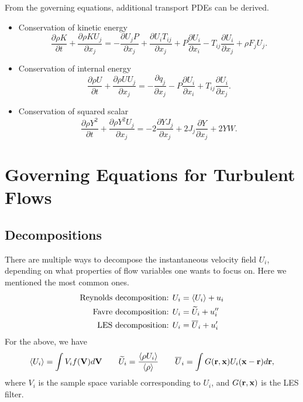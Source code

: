 \documentclass[oneside,a4paper,11pt]{report}
\begin{document}
From the governing equations, additional transport PDEs can be derived.
\begin{itemize}
\item Conservation of kinetic energy
\begin{equation}
\label{eq:cons_kinetic_energy}
\frac{\partial \rho K}{\partial t} + \frac{\partial \rho K U_j}{\partial x_j} = - \frac{\partial U_j P}{\partial x_j} + \frac{\partial U_i T_{ij}}{\partial x_j} + P \frac{\partial U_i}{\partial x_i} - T_{ij} \frac{\partial U_i}{\partial x_j} + \rho F_j U_j .
\end{equation}
\item Conservation of internal energy
\begin{equation}
\label{eq:cons_internal_energy}
\frac{ \partial \rho U}{\partial t} + \frac{\partial \rho U U_j}{\partial x_j} = -\frac{\partial q_j}{\partial x_j} - P \frac{\partial U_i}{\partial x_i} + T_{ij} \frac{\partial U_i}{\partial x_j}.
\end{equation}
\item Conservation of squared scalar
\begin{equation}
    \label{eq:cons_squared_scalar}
    \frac{\partial \rho Y^2}{\partial t} + \frac{\partial \rho Y^2 U_j}{\partial x_j} = -2\frac{\partial Y J_j}{\partial x_j} + 2J_j \frac{\partial Y}{\partial x_j} + 2 Y W.
\end{equation}
\end{itemize}

%
\chapter{Governing Equations for Turbulent Flows}
%

\section{Decompositions}

There are multiple ways to decompose the instantaneous velocity field $U_i$, depending on what properties of flow variables one wants to focus on. Here we mentioned the most common ones.
\begin{align}
\text{Reynolds decomposition: } & U_i = \langle U_i \rangle + u_i \\
\text{Favre decomposition: } & U_i = \widetilde{U}_i + u_i'' \\
\text{LES decomposition: } & U_i = \overline{U}_i + u'_i
\end{align}
For the above, we have
\begin{equation} 
\langle U_i \rangle = \int V_i f(\bold{V}) d\bold{V} \qquad \widetilde{U}_i = \frac{\langle \rho U_i \rangle}{\langle \rho \rangle} \qquad \overline{U}_i = \int G(\bold{r},\bold{x}) U_i(\bold{x} - \bold{r}) d\bold{r},
\end{equation}
where $V_i$ is the sample space variable corresponding to $U_i$, and $G(\mathbf{r}, \mathbf{x})$ is the LES filter.
\end{document}
